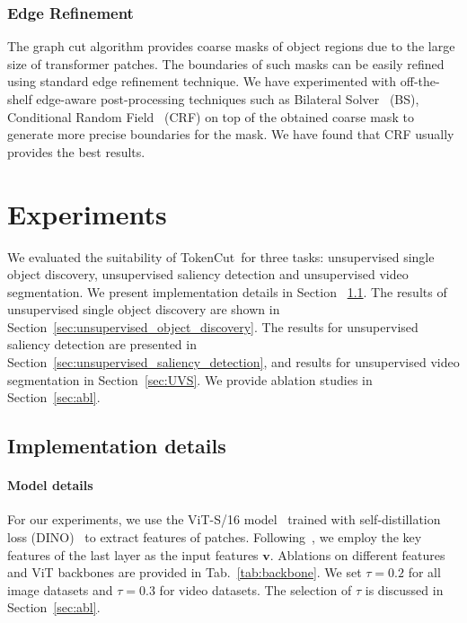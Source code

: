 \documentclass[twocolumn]{article}
\newcommand{\name} {TokenCut}
\newcommand{\feat}{\mathbf{v}}
\begin{document}
\subsubsection{Edge Refinement}

The graph cut algorithm provides coarse masks of object regions due to the large size of transformer patches. The boundaries of such masks can be easily refined using standard edge refinement technique. We have experimented with off-the-shelf edge-aware post-processing techniques such as Bilateral Solver~\cite{barron2016fast} (BS), Conditional Random Field~\cite{krahenbuhl2011efficient} (CRF) on top of the obtained coarse mask to generate more precise boundaries for the mask. We have found that CRF usually provides the best results. 



    
	
	 
	 
	 
	
    

\hfill \break
\section{Experiments}
\label{sec:exp}
We evaluated the suitability of \name~for three tasks: unsupervised single object discovery, unsupervised saliency detection and unsupervised video segmentation. We present implementation details in Section ~\ref{sec:implementation_details}. The results of unsupervised single object discovery are shown in Section~\ref{sec:unsupervised_object_discovery}.  The results for unsupervised saliency detection are presented in Section~\ref{sec:unsupervised_saliency_detection}, and results for unsupervised video segmentation in Section~\ref{sec:UVS}. We provide ablation studies in Section~\ref{sec:abl}.

\subsection{Implementation details}
\label{sec:implementation_details}

\paragraph*{Model details}
For our experiments, we use the ViT-S/16 model~\cite{dosovitskiy2020image} trained with self-distillation loss (DINO)~\cite{caron2021emerging} to extract features of patches. Following~\cite{simeoni2021localizing}, we employ the key features of the last layer as the input features $\feat$. Ablations on different features and ViT backbones are  provided in Tab.~\ref{tab:backbone}. We set $\tau = 0.2$ for all image datasets and $\tau = 0.3$ for video datasets. The selection of $\tau$ is discussed in Section~\ref{sec:abl}.
\end{document}
